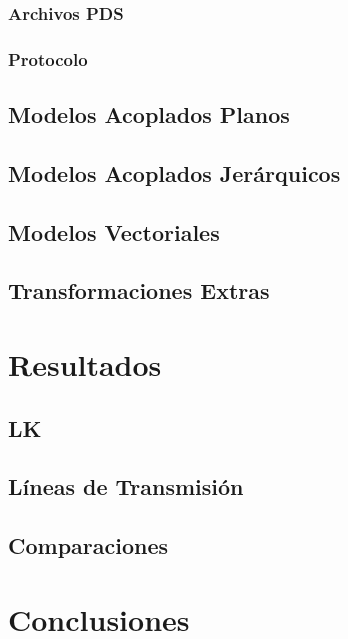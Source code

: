 		\subsubsection{Archivos PDS}
		\subsubsection{Protocolo}
	\subsection{Modelos Acoplados Planos}
	\subsection{Modelos Acoplados Jerárquicos }
	\subsection{Modelos Vectoriales}
	\subsection{Transformaciones Extras}
\section{Resultados}
	\subsection{LK}
	\subsection{Líneas de Transmisión}
	\subsection{Comparaciones}
\section{Conclusiones}




